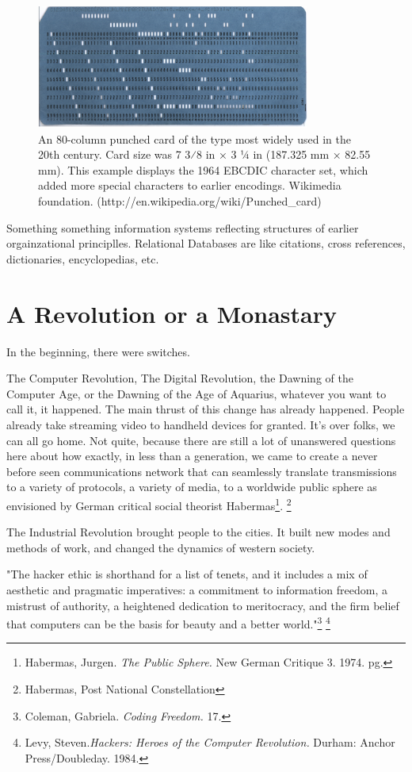 \documentclass[11pt]{article}
\begin{document}
\begin{figure}[ht!]
\center
\includegraphics[width=90mm]{500px-Blue-punch-card-front-horiz.png}
\caption{An 80-column punched card of the type most widely used in the 20th century. Card size was 7 3⁄8 in × 3 1⁄4 in (187.325 mm × 82.55 mm). This example displays the 1964 EBCDIC character set, which added more special characters to earlier encodings. Wikimedia foundation. (http://en.wikipedia.org/wiki/Punched\_card) }
\end{figure}

Something something information systems reflecting structures of earlier orgainzational principlles. Relational Databases are like citations, cross references, dictionaries, encyclopedias, etc.

\section{A Revolution or a Monastary}

In the beginning, there were switches.

The Computer Revolution, The Digital Revolution, the Dawning of the Computer Age, or the Dawning of the Age of Aquarius, whatever you want to call it, it happened. The main thrust of this change has already happened. People already take streaming video to handheld devices for granted. It's over folks, we can all go home. Not quite, because there are still a lot of unanswered questions here about how exactly, in less than a generation, we came to create a never before seen communications network that can seamlessly translate transmissions to a variety of protocols, a variety of media, to a worldwide public sphere as envisioned by German critical social theorist Habermas\footnote{Habermas, Jurgen. \emph{The Public Sphere.} New German Critique 3. 1974. pg.}. \footnote{Habermas, Post National Constellation}

The Industrial Revolution brought people to the cities. It built new modes and methods of work, and changed the dynamics of western society.

"The hacker ethic is shorthand for a list of tenets, and it includes a mix of aesthetic and pragmatic imperatives: a commitment to information freedom, a mistrust of authority, a heightened dedication to meritocracy, and the firm belief that computers can be the basis for beauty and a better world."\footnote{Coleman, Gabriela. \emph{Coding Freedom.} 17.} \footnote{Levy, Steven.\emph{Hackers: Heroes of the Computer Revolution.} Durham: Anchor Press/Doubleday. 1984.}
\end{document}
